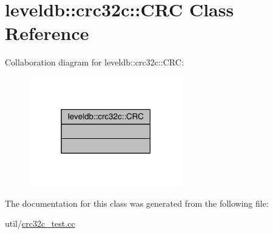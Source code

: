 \hypertarget{classleveldb_1_1crc32c_1_1_c_r_c}{}\section{leveldb\+:\+:crc32c\+:\+:C\+R\+C Class Reference}
\label{classleveldb_1_1crc32c_1_1_c_r_c}


Collaboration diagram for leveldb\+:\+:crc32c\+:\+:C\+R\+C\+:\nopagebreak
\begin{figure}[H]
\begin{center}
\leavevmode
\includegraphics[width=190pt]{classleveldb_1_1crc32c_1_1_c_r_c__coll__graph}
\end{center}
\end{figure}


The documentation for this class was generated from the following file\+:\begin{DoxyCompactItemize}
\item 
util/\hyperlink{crc32c__test_8cc}{crc32c\+\_\+test.\+cc}\end{DoxyCompactItemize}
